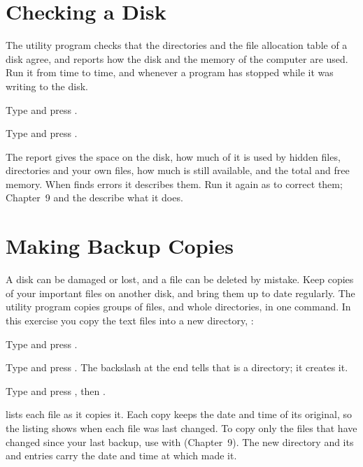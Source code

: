 \section{Checking a Disk}
The  utility program checks that the directories and the file
allocation table of a disk agree, and reports how the disk and the memory of
the computer are used.  Run it from time to time, and whenever a program
has stopped while it was writing to the disk.
\begin{Steps}
\item Type  and press .
\item Type  and press .
\end{Steps}


The report gives the space on the disk, how much of it is used by hidden
files, directories and your own files, how much is still available, and the
total and free memory.  When  finds errors it describes them.
Run it again as  to correct them; Chapter~9 and the
 describe what it does.

\section{Making Backup Copies}
A disk can be damaged or lost, and a file can be deleted by mistake.  Keep
copies of your important files on another disk, and bring them up to date
regularly.  The  utility program copies groups of files, and
whole directories, in one command.  In this exercise you copy the text files
into a new directory, :
\begin{Steps}
\item Type  and press .
\item Type  and press .  The
  backslash at the end tells  that  is a directory;
  it creates it.
\item Type  and press , then .
\end{Steps}


 lists each file as it copies it.  Each copy keeps the date and
time of its original, so the listing shows when each file was last
changed.  To copy only the files that have changed since your last backup,
use  with  (Chapter~9).  The new directory
 and its  and  entries carry the date and time
at which  made it.
